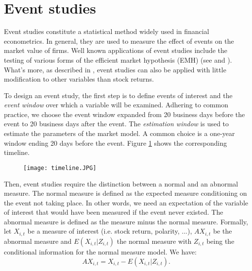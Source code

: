 \section{Event studies}\label{S:event studies}

Event studies constitute a statistical method widely used in financial econometrics. In general, they are used to measure the effect of events on the market value of firms. Well known applications of event studies include the testing of various forms of the efficient market hypothesis (EMH) (see \citet{fama1969} and \citet{fama1991efficient}). What's more, as described in \citet{mackinlay1997event}, event studies can also be applied with little modification to other variables than stock returns. 

To design an event study, the first step is to define events of interest and the \textit{event window} over which a variable will be examined. Adhering to common practice, we choose the event window expanded from 20 business days before the event to 20 business days after the event. The \textit{estimation window} is used to estimate the parameters of the market model. A common choice is a one-year window ending 20 days before the event. Figure \ref{fig:timeline} shows the corresponding timeline. 

\begin{figure}[h]
    \centering
    \texttt{[image: timeline.JPG]}
    \label{fig:timeline}
\end{figure}

Then, event studies require the distinction between a normal and an abnormal measure. The normal measure is defined as the expected measure conditioning on the event not taking place. In other words, we need an expectation of the variable of interest that would have been measured if the event never existed. The abnormal measure is defined as the measure minus the normal measure. Formally, let $X_{i,t}$ be a measure of interest (i.e. stock return, polarity, ...), $AX_{i,t}$ be the abnormal measure and $E(X_{i,t}|Z_{i,t})$ the normal measure with $Z_{i,t}$ being the conditional information for the normal measure model. We have: 
\[     AX_{i,t} = X_{i,t} - E(X_{i,t}|Z_{i,t}).\]

